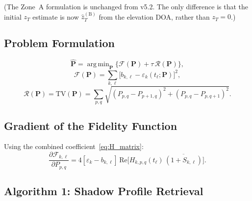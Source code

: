 \documentclass[11pt,a4paper]{article}
\newcommand{\TV}{\mathrm{TV}}
\DeclareMathOperator*{\argmin}{arg\,min}
\begin{document}
(The Zone~A formulation is unchanged from v5.2.  The only difference
is that the initial $z_T$ estimate is now $\hat{z}_T^{(\mathrm{B})}$
from the elevation DOA, rather than $z_T=0$.)

\subsection{Problem Formulation}

\begin{equation}
  \hat{\mathbf{P}} = \argmin_{\mathbf{P}}
  \bigl\{\mathcal{F}(\mathbf{P}) + \tau\,\mathcal{R}(\mathbf{P})\bigr\},
  \label{eq:zone_a_problem}
\end{equation}
\begin{equation}
  \mathcal{F}(\mathbf{P})
  = \sum_{k,\ell}
  \bigl[b_{k,\ell} - \varepsilon_k(t_\ell;\mathbf{P})\bigr]^2,
  \label{eq:fidelity}
\end{equation}
\begin{equation}
  \mathcal{R}(\mathbf{P}) = \TV(\mathbf{P})
  = \sum_{p,q}\sqrt{(P_{p,q}{-}P_{p+1,q})^2
  +(P_{p,q}{-}P_{p,q+1})^2}.
  \label{eq:tv_reg}
\end{equation}

\subsection{Gradient of the Fidelity Function}
\label{sec:gradient}

Using the combined coefficient~\eqref{eq:H_matrix}:
\begin{equation}
  \boxed{
  \frac{\partial\mathcal{F}_{k,\ell}}{\partial P_{p,q}}
  = 4[\varepsilon_k{-}b_{k,\ell}]\,
  \mathrm{Re}\!\bigl[H_{k,p,q}(t_\ell)\,
  \overline{(1{+}S_{k,\ell})}\bigr].}
  \label{eq:grad_fidelity}
\end{equation}

\subsection{Algorithm 1: Shadow Profile Retrieval}
\label{sec:alg1}
\end{document}
